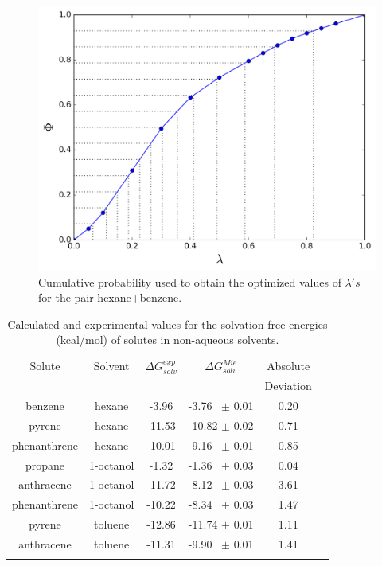 \documentclass[final,12p,times,twocolumn]{elsarticle}
\begin{document}
	\begin{figure}[h]
		\centering
		\includegraphics[width=1.0\linewidth]{Figures/optimized_cdf}
		\caption{Cumulative probability used to obtain the optimized values of $\lambda 's$ for the pair hexane+benzene.}
		\label{fig:optimized_cdf}
	\end{figure}
	
	\begin{table}[h]
		\centering
		\caption{Calculated and experimental values for the solvation free energies (kcal/mol) of solutes in non-aqueous solvents.}
		\label{tbl:solv1}
		\begin{tabular}{cccccc}
			\hline\hline
			Solute       & Solvent   & $\Delta G_{solv}^{exp}$ & $\Delta G_{solv}^{Mie}$ & Absolute  &  \\
			&           &                         &                         & Deviation &  \\ \hline
			benzene      & hexane    & -3.96                   & -3.76  $\,$ $\pm$ 0.01       & 0.20      &  \\
			pyrene       & hexane    & -11.53                  & -10.82 $\pm$ 0.02       & 0.71      &  \\
			phenanthrene & hexane    & -10.01                  & -9.16  $\,$ $\pm$ 0.01       & 0.85      &  \\
			propane      & 1-octanol & -1.32                   & -1.36  $\,$ $\pm$ 0.03       & 0.04      &  \\
			anthracene   & 1-octanol & -11.72                  & -8.12   $\,$ $\pm$ 0.03       & 3.61      &  \\
			phenanthrene & 1-octanol & -10.22                  & -8.34  $\,$ $\pm$ 0.03       & 1.47      &  \\
			pyrene       & toluene   & -12.86                  & -11.74 $\pm$ 0.01       & 1.11      &  \\
			anthracene   & toluene   & -11.31                  & -9.90 $\,$ $\pm$ 0.01        & 1.41      &  \\ \hline\hline
			&
		\end{tabular}
	\end{table}
	
\end{document}
